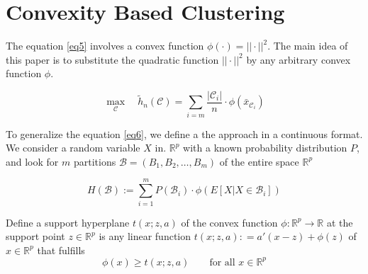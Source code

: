 \documentclass{article}
\begin{document}
\section{Convexity Based Clustering}

The equation \ref{eq5} involves a convex function $\phi(\cdot) = ||\cdot||^2$. The main idea of this paper is to substitute the quadratic function $||\cdot||^2$ by any arbitrary convex function $\phi$.



\begin{equation}\label{eq6}
	\max_{\mathcal C}\quad \tilde h_n(\mathcal C) = \sum_{i=m} \frac{|\mathcal C_i|}{n}\cdot\phi(\bar x_{\mathcal C_i})
\end{equation}

To generalize the equation \ref{eq6}, we define a the approach in a continuous format. We consider a random variable $X$ in. $\mathbb R^p$ with a known probability distribution $P$, and look for $m$ partitions $\mathcal B = (B_1, B_2,\ldots, B_m)$ of the entire space $\mathbb R^p$

\begin{equation}
	H(\mathcal B):=\sum_{i=1}^m P(\mathcal B_i)\cdot \phi(E[X|X\in\mathcal B_i])
\end{equation}




\begin{tcolorbox}[coltitle= black!80, colframe=green!35, colback=green!10 ,title=\textbf{Definition: Support Hyperplanes Defined by Derivatives}]

Define a support hyperplane $t(x;z,a)$ of the convex function $\phi: \mathbb R^p \to \mathbb R$ at the support point $z\in \mathbb R^p$ is any linear function $t(x;z,a): = a'(x-z) + \phi(z)$ of $x\in \mathbb R^p$ that fulfills 
\begin{equation}\label{eq9}
	\phi(x) \ge t(x; z,a) \quad\quad \text{for all } x \in \mathbb R^p
\end{equation}

\end{tcolorbox}
\end{document}
